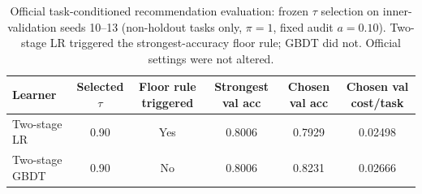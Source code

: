 \begin{table}[h]
\caption{Official task-conditioned recommendation evaluation: frozen $\tau$ selection on inner-validation seeds 10--13 (non-holdout tasks only, $\pi=1$, fixed audit $a=0.10$). Two-stage LR triggered the strongest-accuracy floor rule; GBDT did not. Official settings were not altered.}
\label{tab:t5-tau}
\centering\footnotesize
\setlength{\tabcolsep}{6pt}
\begin{tabular}{@{}lccccc@{}}
\toprule
Learner & Selected $\tau$ & Floor rule triggered & Strongest val acc & Chosen val acc & Chosen val cost/task \\
\midrule
Two-stage LR & 0.90 & Yes & 0.8006 & 0.7929 & 0.02498 \\
Two-stage GBDT & 0.90 & No & 0.8006 & 0.8231 & 0.02666 \\
\bottomrule
\end{tabular}
\end{table}

